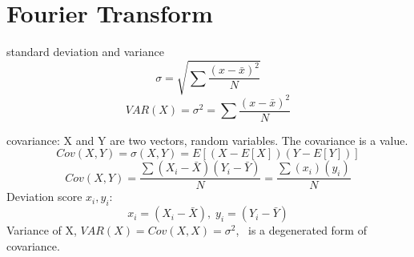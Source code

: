 \section{Fourier Transform}
\begin{compactitem}

\item {standard deviation and variance}
\begin{equation}
\label{eq:std}
\sigma = \sqrt {\sum \frac{(x-\bar{x})^2}{N}}
\end{equation}
\begin{equation}
\label{eq:variance}
VAR(X)=\sigma^{2} = {\sum \frac{(x-\bar{x})^2}{N}}
\end{equation}

\item covariance: X and Y are two vectors, random variables. The covariance is a value.
\begin{equation}
\label{eq:covar}
Cov(X,Y)=\sigma(X,Y)=E[(X - E[X])(Y-E[Y])]
\end{equation}
\begin{equation}
\label{eq:covar1}
Cov(X,Y)=\frac{\sum(X_i-\bar{X})(Y_i-\bar{Y})}{N}=
\frac{\sum(x_i)(y_i)}{N}
\end{equation}
Deviation score $x_i, y_i$:
\begin{equation}
\label{eq:covar1}
x_{i}=(X_i-\bar{X}),\;
y_{i}=(Y_i-\bar{Y})
\end{equation}
Variance of X, $VAR(X)=Cov(X,X)=\sigma^{2}$, \ is a degenerated form of covariance.\\


\end{compactitem}
